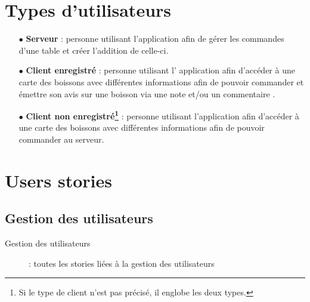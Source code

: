 

\section{Types d'utilisateurs}
\begin{itemize}
	\item[{$\bullet$}] \textbf{Serveur} : personne utilisant l'application
	afin de gérer les commandes d'une table et créer l'addition de celle-ci.
	\item[{$\bullet$}] \textbf{Client enregistré} : personne utilisant l'
	application afin d'accéder à une carte des boissons avec différentes 
	informations afin de pouvoir commander et 
	émettre son avis sur une boisson via une note et/ou un commentaire .
	\item[{$\bullet$}] \textbf{Client non enregistré\footnote{Si le type
	de client n'est pas précisé, il englobe les deux types.}} : personne
	utilisant l'application afin d'accéder à une carte des boissons avec
	différentes informations afin de pouvoir commander au serveur.
\end{itemize}

\section{Users stories}
\subsection{Gestion des utilisateurs}

\begin{description}
	\item[Gestion des utilisateurs] : toutes les stories liées à la gestion des utilisateurs
\end{description}

